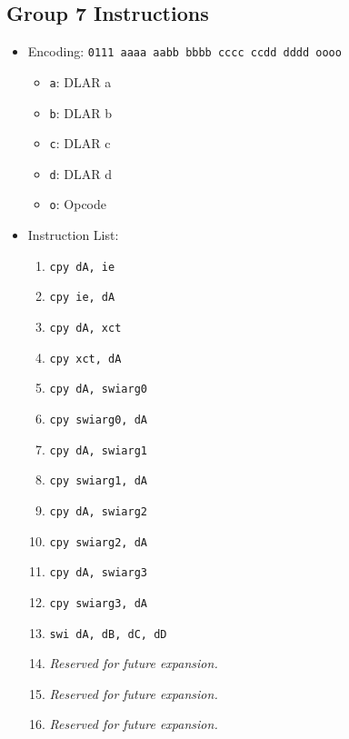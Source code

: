 \documentclass{article}
\begin{document}
	\subsection{Group 7 Instructions}
		\begin{itemize}
		\item Encoding:  \texttt{0111 aaaa aabb bbbb  cccc ccdd dddd oooo}
			\begin{itemize}
			\item \texttt{a}:  DLAR a
			\item \texttt{b}:  DLAR b
			\item \texttt{c}:  DLAR c
			\item \texttt{d}:  DLAR d
			\item \texttt{o}:  Opcode
			\end{itemize}

		\item Instruction List:
			\begin{enumerate}
			\item \texttt{cpy dA, ie}
			\item \texttt{cpy ie, dA}
			\item \texttt{cpy dA, xct}
			\item \texttt{cpy xct, dA}

			\item \texttt{cpy dA, swiarg0}
			\item \texttt{cpy swiarg0, dA}
			\item \texttt{cpy dA, swiarg1}
			\item \texttt{cpy swiarg1, dA}

			\item \texttt{cpy dA, swiarg2}
			\item \texttt{cpy swiarg2, dA}
			\item \texttt{cpy dA, swiarg3}
			\item \texttt{cpy swiarg3, dA}

			\item \texttt{swi dA, dB, dC, dD}
			\item \textit{Reserved for future expansion.}
			\item \textit{Reserved for future expansion.}
			\item \textit{Reserved for future expansion.}
			\end{enumerate}
		\end{itemize}
\end{document}
